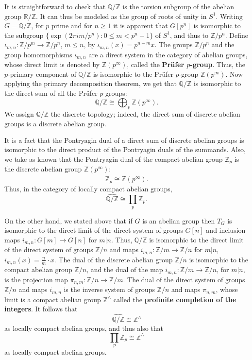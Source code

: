 \documentclass{article}
\theoremstyle{definition}
\begin{document}
It is straightforward to check that 
$\mathbb{Q}/\mathbb{Z}$ is the torsion subgroup of the abelian group $\mathbb{R}/\mathbb{Z}$. It can thus be modeled as the
group of roots of unity in $S^1$. Writing $G=\mathbb{Q}/\mathbb{Z}$, for $p$ prime and for $n \geq 1$
it is apparent that $G[p^n]$ is isomorphic to the subgroup $\{\exp(2\pi i m/p^n): 0\leq m < p^n-1\}$ of $S^1$, and thus to
$\mathbb{Z}/p^n$. Define $\iota_{m,n}:\mathbb{Z}/p^m \to \mathbb{Z}/p^n$, $m \leq n$, by $\iota_{m,n}(x)=p^{n-m}x$. The groups
$\mathbb{Z}/p^n$ and the group homomorphisms $\iota_{m,n}$ are a direct system in the category of abelian groups,
whose direct limit is denoted by $\mathbb{Z}(p^\infty)$, called the \textbf{Pr\"ufer $p$-group}.
Thus,  the
$p$-primary component of $\mathbb{Q}/\mathbb{Z}$ is isomorphic to the Pr\"ufer $p$-group 
$\mathbb{Z}(p^\infty)$. 
Now applying the primary decomposition theorem, we get that $\mathbb{Q}/\mathbb{Z}$ is isomorphic to the direct sum of all the  Pr\"ufer $p$-groups:
\begin{equation}
\mathbb{Q}/\mathbb{Z} \cong \bigoplus_p \mathbb{Z}(p^\infty).
\label{QmodZ}
\end{equation}
We assign $\mathbb{Q}/\mathbb{Z}$ the discrete topology; indeed, the direct sum of discrete abelian groups
is a discrete abelian group.

It is a fact that the Pontryagin dual of a direct sum of discrete abelian groups is isomorphic
to the direct product of the Pontryagin duals of the summands. Also, we take as known that
the Pontryagin dual of
the compact abelian group $\mathbb{Z}_p$ is the discrete abelian group $\mathbb{Z}(p^\infty)$:
\[
\widehat{\mathbb{Z}_p} \cong \mathbb{Z}(p^\infty).
\]
Thus, in the category of locally compact abelian groups,
\[
\widehat{\mathbb{Q}/\mathbb{Z}} \cong \prod_p \mathbb{Z}_p.
\]

On the other hand, we stated above that if $G$ is an abelian group then $T_G$ is isomorphic to the direct limit
of the direct system of groups $G[n]$ and inclusion maps $i_{m,n}:G[m] \to G[n]$ for $m|n$. Thus, 
$\mathbb{Q}/\mathbb{Z}$ is isomorphic to the direct limit of the direct system of groups $\mathbb{Z}/n$ and  
maps $i_{m,n}:\mathbb{Z}/m \to \mathbb{Z}/n$ for $m|n$, $i_{m,n}(x)=\frac{n}{m}\cdot x$. The dual of the discrete abelian group $\mathbb{Z}/n$ is isomorphic
to the compact abelian group $\mathbb{Z}/n$, and the dual of the  map $i_{m,n}:\mathbb{Z}/m \to \mathbb{Z}/n$, for
$m|n$, is the 
projection map $\pi_{n,m}:\mathbb{Z}/n \to \mathbb{Z}/m$. The dual of the direct system 
of groups $\mathbb{Z}/n$ and maps $i_{m,n}$ is the inverse system of groups $\mathbb{Z}/n$ and maps
$\pi_{n,m}$, whose limit is a compact abelian group $\mathbb{Z}^\wedge$ called the \textbf{profinite completion of the integers}. It follows that
\[
\widehat{\mathbb{Q}/\mathbb{Z}} \cong \mathbb{Z}^\wedge
\]
as locally compact abelian groups, and thus also that
\[
\prod_p \mathbb{Z}_p \cong \mathbb{Z}^\wedge
\]
as locally compact abelian groups.
\end{document}
